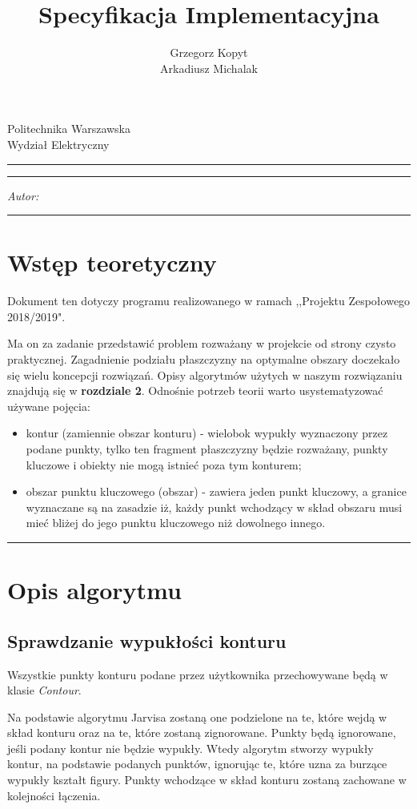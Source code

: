 \documentclass[a4paper,11pt]{article}
\author{Grzegorz Kopyt\\Arkadiusz Michalak}
\title{Specyfikacja Implementacyjna}
\makeatletter
\newcommand{\linia}{\rule{\linewidth}{0.4mm}}
\renewcommand{\maketitle}{\begin{titlepage}
    \vspace*{2cm}
    \begin{center}\LARGE
    Politechnika Warszawska\\
    Wydział Elektryczny\\
    \end{center}
    \vspace{5cm}
    \noindent\linia
    \begin{center}
      \LARGE \textsc{\@title}
         \end{center}
     \linia
    \vspace{0.5cm}
    \begin{flushright}
    \begin{minipage}{5cm}
    \textit{Autor:}\\
    \normalsize \textsc{\@author} \par
    \end{minipage}
    \vspace{5cm}
     \end{flushright}
    \vspace*{\stretch{6}}
    \begin{center}
    \@date
    \end{center}
  \end{titlepage}
}
\makeatother
\begin{document}
\maketitle

\tableofcontents
\vspace{1cm}
\noindent\linia

\section{Wstęp teoretyczny}
Dokument ten dotyczy programu realizowanego w ramach ,,Projektu Zespołowego 2018/2019".

Ma on za zadanie przedstawić problem rozważany w projekcie od strony czysto praktycznej. Zagadnienie podziału płaszczyzny na optymalne obszary doczekało się wielu koncepcji rozwiązań. Opisy algorytmów użytych w naszym rozwiązaniu znajdują się w \textbf{rozdziale 2}. Odnośnie potrzeb teorii warto usystematyzować używane pojęcia:
\begin{itemize}
\item kontur (zamiennie obszar konturu) - wielobok wypukły wyznaczony przez podane punkty, tylko ten fragment płaszczyzny będzie rozważany, punkty kluczowe i obiekty nie mogą istnieć poza tym konturem;
\item obszar punktu kluczowego (obszar) - zawiera jeden punkt kluczowy, a granice wyznaczane są na zasadzie iż, każdy punkt wchodzący w skład obszaru musi mieć bliżej do jego punktu kluczowego niż dowolnego innego.
\end{itemize} 

\noindent\linia
\section{Opis algorytmu}
\subsection{Sprawdzanie wypukłości konturu}
Wszystkie punkty konturu podane przez użytkownika przechowywane będą w klasie \textit{Contour}.

Na podstawie algorytmu Jarvisa zostaną one podzielone na te, które wejdą w skład konturu oraz na te, które zostaną zignorowane. Punkty będą ignorowane, jeśli podany kontur nie będzie wypukły. Wtedy algorytm stworzy wypukły kontur, na podstawie podanych punktów, ignorując te, które uzna za burzące wypukły kształt figury. Punkty wchodzące w skład konturu zostaną zachowane w kolejności łączenia.
\end{document}
